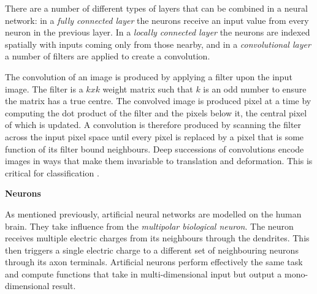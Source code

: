 \documentclass[a4paper,11pt,titlepage]{article}
\begin{document}
		\par 
		There are a number of different types of layers that can be combined in a neural network: in a \textit{fully connected layer} the neurons receive an input value from every neuron in the previous layer. In a \textit{locally connected layer} the neurons are indexed spatially with inputs coming only from those nearby, and in a \textit{convolutional layer} a number of filters are applied to create a convolution. 
		\par
		The convolution of an image is produced by applying a filter upon the input image. The filter is a $k x k$ weight matrix such that $ k $ is an odd number to ensure the matrix has a true centre. The convolved image is produced pixel at a time by computing the dot product of the filter and the pixels below it, the central pixel of which is updated. A convolution is therefore produced by scanning the filter across the input pixel space until every pixel is replaced by a pixel that is some function of its filter bound neighbours. Deep successions of convolutions encode images in ways that make them invariable to translation and deformation. This is critical for classification \cite{Bruna2012}.
\par 

\textbf{Neurons}
		
		\begin{figure}[H]
    			\centering	
    			\qquad
    			\caption{}%
    			\label{fig:biologicalNeurons}
		\end{figure}
				
		As mentioned previously, artificial neural networks are modelled on the human brain. They take influence from the \textit{multipolar biological neuron}. The neuron receives multiple electric charges from its neighbours through the dendrites. This then triggers a single electric charge to a different set of neighbouring neurons through its axon terminals. Artificial neurons perform effectively the same task and compute functions that take in multi-dimensional input but output a mono-dimensional result.
				\\\
\end{document}
